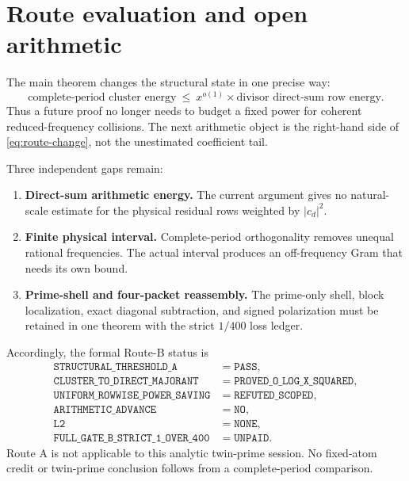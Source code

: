 \documentclass[11pt]{article}
\theoremstyle{definition}
\theoremstyle{remark}
\begin{document}
\section{Route evaluation and open arithmetic}

The main theorem changes the structural state in one precise way:
\begin{equation}
 \text{complete-period cluster energy}
 \ \le\ x^{o(1)}\times
 \text{divisor direct-sum row energy}.
 \label{eq:route-change}
\end{equation}
Thus a future proof no longer needs to budget a fixed power for coherent
reduced-frequency collisions.  The next arithmetic object is the right-hand
side of \eqref{eq:route-change}, not the unestimated coefficient tail.

Three independent gaps remain:
\begin{enumerate}[leftmargin=2em]
 \item \textbf{Direct-sum arithmetic energy.}  The current argument gives no
       natural-scale estimate for the physical residual rows weighted by
       $|c_d|^2$.
 \item \textbf{Finite physical interval.}  Complete-period orthogonality
       removes unequal rational frequencies.  The actual interval produces an
       off-frequency Gram that needs its own bound.
 \item \textbf{Prime-shell and four-packet reassembly.}  The prime-only shell,
       block localization, exact diagonal subtraction, and signed
       polarization must be retained in one theorem with the strict
       $1/400$ loss ledger.
\end{enumerate}

Accordingly, the formal Route-B status is
\begin{equation*}
\begin{array}{ll}
\texttt{STRUCTURAL\_THRESHOLD\_A} &= \texttt{PASS},\\
\texttt{CLUSTER\_TO\_DIRECT\_MAJORANT} &=
  \texttt{PROVED\_O\_LOG\_X\_SQUARED},\\
\texttt{UNIFORM\_ROWWISE\_POWER\_SAVING} &=
  \texttt{REFUTED\_SCOPED},\\
\texttt{ARITHMETIC\_ADVANCE} &= \texttt{NO},\\
\texttt{L2} &= \texttt{NONE},\\
\texttt{FULL\_GATE\_B\_STRICT\_1\_OVER\_400} &= \texttt{UNPAID}.
\end{array}
\end{equation*}
Route A is not applicable to this analytic twin-prime session.  No fixed-atom
credit or twin-prime conclusion follows from a complete-period comparison.
\end{document}
